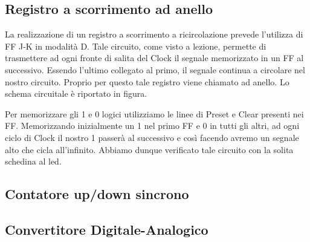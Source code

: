 \subsection{Registro a scorrimento ad anello}
La realizzazione di un registro a scorrimento a ricircolazione prevede l'utilizza di FF J-K in modalità D. Tale circuito, come visto a lezione, permette di trasmettere ad ogni fronte di salita del Clock il segnale memorizzato in un FF al successivo. Essendo l'ultimo collegato al primo, il segnale continua a circolare nel nostro circuito. Proprio per questo tale registro viene chiamato ad anello. Lo schema circuitale è riportato in figura. 

Per memorizzare gli 1 e 0 logici utilizziamo le linee di Preset e Clear presenti nei FF. Memorizzando inizialmente un 1 nel primo FF e 0 in tutti gli altri, ad ogni ciclo di Clock il nostro 1 passerà al successivo e così facendo avremo un segnale alto che cicla all'infinito. Abbiamo dunque verificato tale circuito con la solita schedina al led. 



\subsection{Contatore up/down sincrono}



\subsection{Convertitore Digitale-Analogico}
